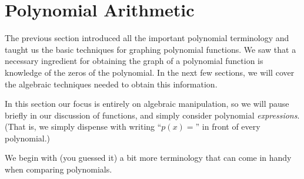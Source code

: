 \section{Polynomial Arithmetic}
\label{PolyArith}


The previous section introduced all the important polynomial terminology and taught us the basic techniques for graphing polynomial functions. We saw that a necessary ingredient for obtaining the graph of a polynomial function is knowledge of the zeros of the polynomial. In the next few sections, we will cover the algebraic techniques needed to obtain this information.

In this section our focus is entirely on algebraic manipulation, so we will pause briefly in our discussion of functions, and simply consider polynomial \textit{expressions}. (That is, we simply dispense with writing ``$p(x)=$'' in front of every polynomial.)

We begin with (you guessed it) a bit more terminology that can come in handy when comparing polynomials.



